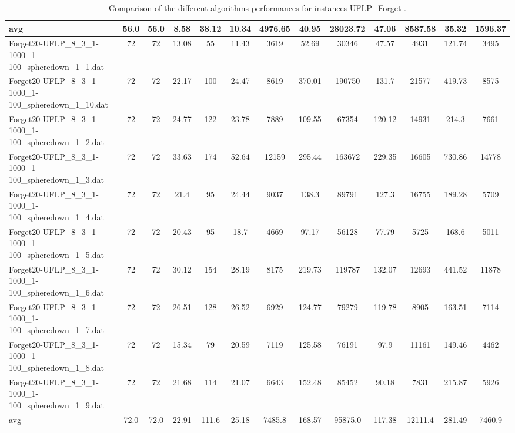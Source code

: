 \begin{table}[!ht]
{\begin{tabular}{lcccccccccccc}
\hline avg & 56.0 & 56.0 & 8.58& 38.12 & 10.34& 4976.65 & 40.95& 28023.72 & 47.06& 8587.58 & 35.32& 1596.37\\ \hline
Forget20-UFLP\_8\_3\_1-1000\_1-100\_spheredown\_1\_1.dat & 72 & 72 & 13.08 & 55 & 11.43 & 3619 & 52.69 & 30346 & 47.57 & 4931 & 121.74 & 3495 \\
Forget20-UFLP\_8\_3\_1-1000\_1-100\_spheredown\_1\_10.dat & 72 & 72 & 22.17 & 100 & 24.47 & 8619 & 370.01 & 190750 & 131.7 & 21577 & 419.73 & 8575 \\
Forget20-UFLP\_8\_3\_1-1000\_1-100\_spheredown\_1\_2.dat & 72 & 72 & 24.77 & 122 & 23.78 & 7889 & 109.55 & 67354 & 120.12 & 14931 & 214.3 & 7661 \\
Forget20-UFLP\_8\_3\_1-1000\_1-100\_spheredown\_1\_3.dat & 72 & 72 & 33.63 & 174 & 52.64 & 12159 & 295.44 & 163672 & 229.35 & 16605 & 730.86 & 14778 \\
Forget20-UFLP\_8\_3\_1-1000\_1-100\_spheredown\_1\_4.dat & 72 & 72 & 21.4 & 95 & 24.44 & 9037 & 138.3 & 89791 & 127.3 & 16755 & 189.28 & 5709 \\
Forget20-UFLP\_8\_3\_1-1000\_1-100\_spheredown\_1\_5.dat & 72 & 72 & 20.43 & 95 & 18.7 & 4669 & 97.17 & 56128 & 77.79 & 5725 & 168.6 & 5011 \\
Forget20-UFLP\_8\_3\_1-1000\_1-100\_spheredown\_1\_6.dat & 72 & 72 & 30.12 & 154 & 28.19 & 8175 & 219.73 & 119787 & 132.07 & 12693 & 441.52 & 11878 \\
Forget20-UFLP\_8\_3\_1-1000\_1-100\_spheredown\_1\_7.dat & 72 & 72 & 26.51 & 128 & 26.52 & 6929 & 124.77 & 79279 & 119.78 & 8905 & 163.51 & 7114 \\
Forget20-UFLP\_8\_3\_1-1000\_1-100\_spheredown\_1\_8.dat & 72 & 72 & 15.34 & 79 & 20.59 & 7119 & 125.58 & 76191 & 97.9 & 11161 & 149.46 & 4462 \\
Forget20-UFLP\_8\_3\_1-1000\_1-100\_spheredown\_1\_9.dat & 72 & 72 & 21.68 & 114 & 21.07 & 6643 & 152.48 & 85452 & 90.18 & 7831 & 215.87 & 5926 \\
\hline avg & 72.0 & 72.0 &  22.91 & 111.6 &  25.18 & 7485.8 &  168.57 & 95875.0 &  117.38 & 12111.4 &  281.49 & 7460.9 \\ \hline
\bottomrule
\end{tabular}
}%
\caption{Comparison of the different algorithms performances for instances UFLP_Forget .}
\end{table}
